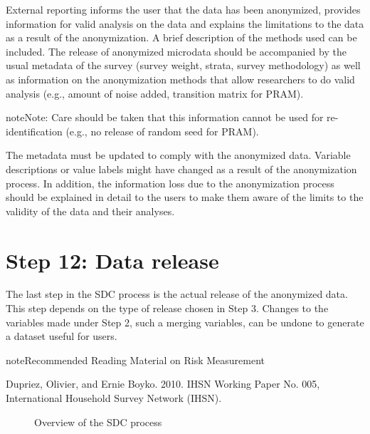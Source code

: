 \documentclass[letterpaper,10pt,english]{sphinxmanual}
\begin{document}
External reporting informs the user that the data has been anonymized,
provides information for valid analysis on the data and explains the
limitations to the data as a result of the anonymization. A brief
description of the methods used can be included. The release of
anonymized microdata should be accompanied by the usual metadata of the
survey (survey weight, strata, survey methodology) as well as
information on the anonymization methods that allow researchers to do
valid analysis (e.g., amount of noise added, transition matrix for
PRAM).

\begin{sphinxadmonition}{note}{Note:}
Care should be taken that this information cannot be used
for re-identification (e.g., no release of random seed for PRAM).
\end{sphinxadmonition}

The metadata must be updated to comply with the anonymized data. Variable
descriptions or value labels might have changed as a result of the
anonymization process. In addition, the information loss due to the
anonymization process should be explained in detail to the users to make
them aware of the limits to the validity of the data and their analyses.


\section{Step 12: Data release}
\label{\detokenize{process:step-12-data-release}}
The last step in the SDC process is the actual release of the anonymized
data. This step depends on the type of release chosen in Step 3. Changes
to the variables made under Step 2, such a merging variables, can be
undone to generate a dataset useful for users.

\begin{sphinxadmonition}{note}{Recommended Reading Material on Risk Measurement}

Dupriez, Olivier, and Ernie Boyko. 2010.  IHSN Working Paper No.
005, International Household Survey Network (IHSN).
\end{sphinxadmonition}

\begin{figure}[htbp]
\centering
\capstart

\noindent{}
\caption{Overview of the SDC process}\label{\detokenize{process:fig81}}\label{\detokenize{process:id2}}\end{figure}
\end{document}
